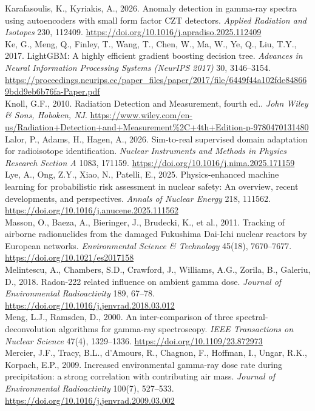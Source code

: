 \documentclass[11pt,a4paper]{article}
\begin{document}
\begin{framed}
\noindent Karafasoulis, K., Kyriakis, A., 2026. Anomaly detection in gamma-ray spectra using autoencoders with small form factor CZT detectors. \textit{Applied Radiation and Isotopes} 230, 112409. \url{https://doi.org/10.1016/j.apradiso.2025.112409}\\[0.5em]
\noindent Ke, G., Meng, Q., Finley, T., Wang, T., Chen, W., Ma, W., Ye, Q., Liu, T.Y., 2017. LightGBM: A highly efficient gradient boosting decision tree. \textit{Advances in Neural Information Processing Systems (NeurIPS 2017)} 30, 3146--3154. \url{https://proceedings.neurips.cc/paper_files/paper/2017/file/6449f44a102fde848669bdd9eb6b76fa-Paper.pdf}\\[0.5em]
\noindent Knoll, G.F., 2010. Radiation Detection and Measurement, fourth ed.. \textit{John Wiley \& Sons, Hoboken, NJ}. \url{https://www.wiley.com/en-us/Radiation+Detection+and+Measurement%2C+4th+Edition-p-9780470131480}\\[0.5em]
\noindent Lalor, P., Adams, H., Hagen, A., 2026. Sim-to-real supervised domain adaptation for radioisotope identification. \textit{Nuclear Instruments and Methods in Physics Research Section A} 1083, 171159. \url{https://doi.org/10.1016/j.nima.2025.171159}\\[0.5em]
\noindent Lye, A., Ong, Z.Y., Xiao, N., Patelli, E., 2025. Physics-enhanced machine learning for probabilistic risk assessment in nuclear safety: An overview, recent developments, and perspectives. \textit{Annals of Nuclear Energy} 218, 111562. \url{https://doi.org/10.1016/j.anucene.2025.111562}\\[0.5em]
\noindent Masson, O., Baeza, A., Bieringer, J., Brudecki, K., et al., 2011. Tracking of airborne radionuclides from the damaged Fukushima Dai-Ichi nuclear reactors by European networks. \textit{Environmental Science \& Technology} 45(18), 7670--7677. \url{https://doi.org/10.1021/es2017158}\\[0.5em]
\noindent Melintescu, A., Chambers, S.D., Crawford, J., Williams, A.G., Zorila, B., Galeriu, D., 2018. Radon-222 related influence on ambient gamma dose. \textit{Journal of Environmental Radioactivity} 189, 67--78. \url{https://doi.org/10.1016/j.jenvrad.2018.03.012}\\[0.5em]
\noindent Meng, L.J., Ramsden, D., 2000. An inter-comparison of three spectral-deconvolution algorithms for gamma-ray spectroscopy. \textit{IEEE Transactions on Nuclear Science} 47(4), 1329--1336. \url{https://doi.org/10.1109/23.872973}\\[0.5em]
\noindent Mercier, J.F., Tracy, B.L., d'Amours, R., Chagnon, F., Hoffman, I., Ungar, R.K., Korpach, E.P., 2009. Increased environmental gamma-ray dose rate during precipitation: a strong correlation with contributing air mass. \textit{Journal of Environmental Radioactivity} 100(7), 527--533. \url{https://doi.org/10.1016/j.jenvrad.2009.03.002}\\[0.5em]

\end{framed}
\end{document}
